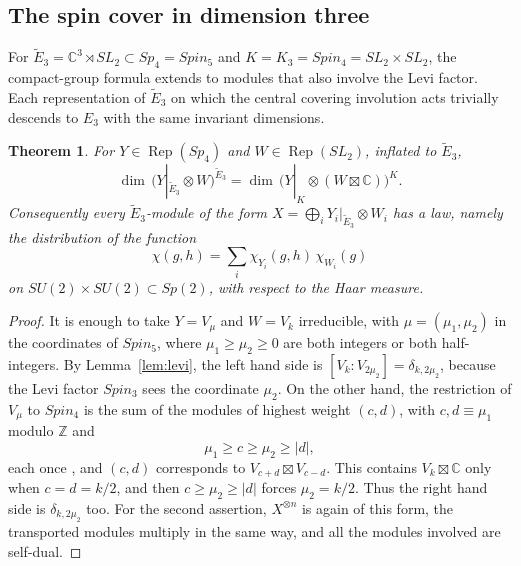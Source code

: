 \documentclass[11pt,reqno]{amsart}
\newtheorem{theorem}{Theorem}[section]
\theoremstyle{definition}
\newcommand{\CC}{\mathbb C}
\newcommand{\ZZ}{\mathbb Z}
\newcommand{\Rep}{\operatorname{Rep}}
\begin{document}
\subsection{The spin cover in dimension three}
For $\widetilde E_3=\CC^3\rtimes SL_2\subset Sp_4=Spin_5$ and $K=K_3=Spin_4=SL_2\times SL_2$, the compact-group formula extends to modules that also involve the Levi factor. Each representation of $\widetilde E_3$ on which the central covering involution acts trivially descends to $E_3$ with the same invariant dimensions.

\begin{theorem}\label{thm:contraction}
For $Y\in\Rep(Sp_4)$ and $W\in\Rep(SL_2)$, inflated to $\widetilde E_3$,
\[
   \dim\,(Y|_{\widetilde E_3}\otimes W)^{\widetilde E_3}=\dim\,\bigl(Y|_K\otimes(W\boxtimes\CC)\bigr)^K .
\]
Consequently every $\widetilde E_3$-module of the form $X=\bigoplus_iY_i|_{\widetilde E_3}\otimes W_i$ has a law, namely the distribution of the function
\[
   \chi(g,h)=\sum_i\chi_{Y_i}(g,h)\,\chi_{W_i}(g)
\]
on $SU(2)\times SU(2)\subset Sp(2)$, with respect to the Haar measure.
\end{theorem}

\begin{proof}
It is enough to take $Y=V_\mu$ and $W=V_k$ irreducible, with $\mu=(\mu_1,\mu_2)$ in the coordinates of $Spin_5$, where $\mu_1\geq\mu_2\geq0$ are both integers or both half-integers. By Lemma~\ref{lem:levi}, the left hand side is $[V_k:V_{2\mu_2}]=\delta_{k,2\mu_2}$, because the Levi factor $Spin_3$ sees the coordinate $\mu_2$. On the other hand, the restriction of $V_\mu$ to $Spin_4$ is the sum of the modules of highest weight $(c,d)$, with $c,d\equiv\mu_1$ modulo $\ZZ$ and
\[
   \mu_1\geq c\geq\mu_2\geq|d| ,
\]
each once \cite{GW}, and $(c,d)$ corresponds to $V_{c+d}\boxtimes V_{c-d}$. This contains $V_k\boxtimes\CC$ only when $c=d=k/2$, and then $c\geq\mu_2\geq|d|$ forces $\mu_2=k/2$. Thus the right hand side is $\delta_{k,2\mu_2}$ too. For the second assertion, $X^{\otimes n}$ is again of this form, the transported modules multiply in the same way, and all the modules involved are self-dual.
\end{proof}
\end{document}
